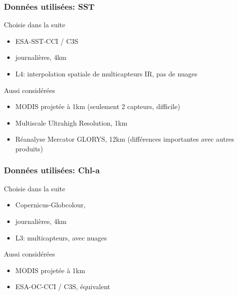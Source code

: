 
\begin{frame}
  \frametitle{Données utilisées: SST}

  \begin{block}{Choisie dans la suite}
    \begin{itemize}
      \item ESA-SST-CCI / C3S
      \item journalières, 4km
      \item L4: interpolation spatiale de multicapteurs IR, pas de nuages
    \end{itemize}
  \end{block}

  \begin{block}{Aussi considérées}
    \begin{itemize}
      \item MODIS projetée à 1km (seulement 2 capteurs, difficile)
      \item Multiscale Ultrahigh Resolution, 1km
      \item Réanalyse Mercator GLORYS, 12km (différences importantes avec autres produits)
    \end{itemize}
  \end{block}

\end{frame}

\begin{frame}
  \frametitle{Données utilisées: Chl-a}

  \begin{block}{Choisie dans la suite}
    \begin{itemize}
      \item Copernicus-Globcolour,
      \item journalières, 4km
      \item L3: multicapteurs, avec nuages
    \end{itemize}
  \end{block}

  \begin{block}{Aussi considérées}
    \begin{itemize}
      \item MODIS projetée à 1km
      \item ESA-OC-CCI / C3S, équivalent
    \end{itemize}
  \end{block}

\end{frame}

